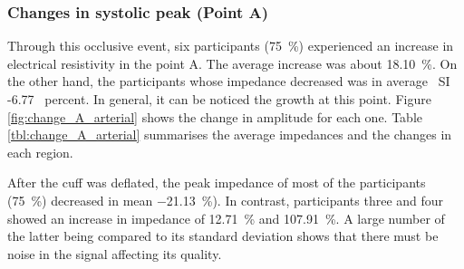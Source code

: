 \subsubsection{Changes in systolic peak (Point A)}
\label{section5.3.2.1}
Through this occlusive event, six participants (\SI{75}{\percent}) experienced an increase in electrical resistivity in the point A. The average increase was about \SI{18.10}{\percent}.  On the other hand, the participants whose impedance decreased was in average \ SI {-6.77} {\ percent}. In general, it can be noticed the growth at this point. Figure \ref{fig:change_A_arterial} shows the change in amplitude for each one. Table \ref{tbl:change_A_arterial} summarises the average impedances and the changes in each region. 

After the cuff was deflated, the peak impedance of most of the participants (\SI{75}{\percent})  decreased in mean \SI{-21.13}{\percent}).  In contrast, participants three and four showed an increase in impedance of \SI{12.71}{\percent} and \SI{107.91}{\percent}. A large number of the latter being compared to its standard deviation shows that there must be noise in the signal affecting its quality.   

